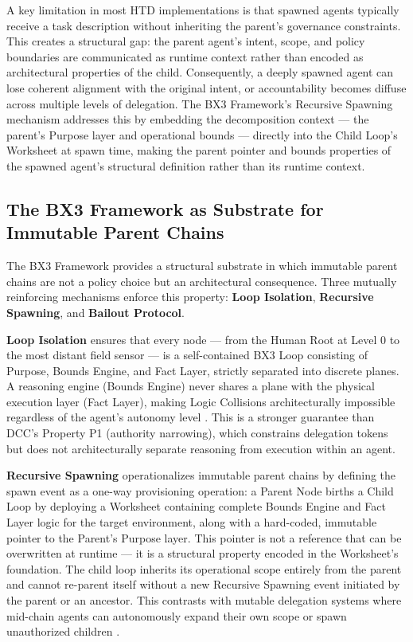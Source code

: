 A key limitation in most HTD implementations is that spawned agents typically receive a task description without inheriting the parent's governance constraints. This creates a structural gap: the parent agent's intent, scope, and policy boundaries are communicated as runtime context rather than encoded as architectural properties of the child. Consequently, a deeply spawned agent can lose coherent alignment with the original intent, or accountability becomes diffuse across multiple levels of delegation. The BX3 Framework's Recursive Spawning mechanism addresses this by embedding the decomposition context — the parent's Purpose layer and operational bounds — directly into the Child Loop's Worksheet at spawn time, making the parent pointer and bounds properties of the spawned agent's structural definition rather than its runtime context.

\subsection{The BX3 Framework as Substrate for Immutable Parent Chains}
\label{sec:bx3-substrate}

The BX3 Framework provides a structural substrate in which immutable parent chains are not a policy choice but an architectural consequence. Three mutually reinforcing mechanisms enforce this property: \textbf{Loop Isolation}, \textbf{Recursive Spawning}, and \textbf{Bailout Protocol}.

\textbf{Loop Isolation} ensures that every node — from the Human Root at Level 0 to the most distant field sensor — is a self-contained BX3 Loop consisting of Purpose, Bounds Engine, and Fact Layer, strictly separated into discrete planes. A reasoning engine (Bounds Engine) never shares a plane with the physical execution layer (Fact Layer), making Logic Collisions architecturally impossible regardless of the agent's autonomy level \cite{bx3_universal_spec_2026}. This is a stronger guarantee than DCC's Property P1 (authority narrowing), which constrains delegation tokens but does not architecturally separate reasoning from execution within an agent.

\textbf{Recursive Spawning} operationalizes immutable parent chains by defining the spawn event as a one-way provisioning operation: a Parent Node births a Child Loop by deploying a Worksheet containing complete Bounds Engine and Fact Layer logic for the target environment, along with a hard-coded, immutable pointer to the Parent's Purpose layer. This pointer is not a reference that can be overwritten at runtime — it is a structural property encoded in the Worksheet's foundation. The child loop inherits its operational scope entirely from the parent and cannot re-parent itself without a new Recursive Spawning event initiated by the parent or an ancestor. This contrasts with mutable delegation systems where mid-chain agents can autonomously expand their own scope or spawn unauthorized children \cite{sentinel_agent_2026}.

